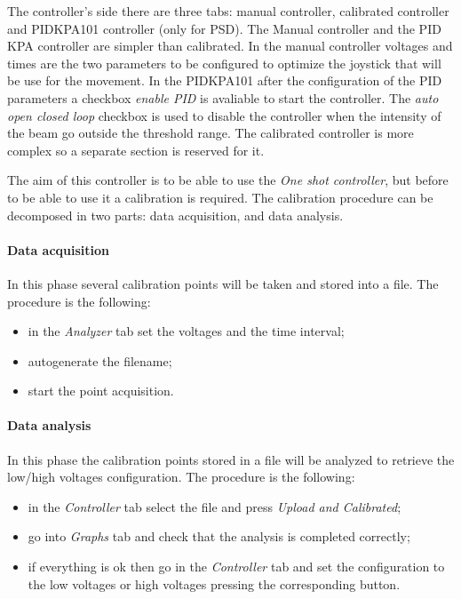 The controller's side there are three tabs: manual controller, calibrated
controller and PIDKPA101 controller (only for PSD).
The Manual controller and the PID KPA controller are simpler than calibrated.
In the manual controller voltages and times are the two parameters to be configured to optimize the joystick that will be use for the movement.
In the PIDKPA101 after the configuration of the PID parameters a checkbox \emph{enable PID}
is avaliable to start the controller. The \emph{auto open closed loop} checkbox is used to
disable the controller when the intensity of the beam go outside the
threshold range.
The calibrated controller is more complex so a separate section is reserved for it.



The aim of this controller is to be able to use the \emph{One shot controller}, but before to be able to use it a calibration is required. The calibration procedure can be decomposed in two parts:
data acquisition, and data analysis.

\paragraph{Data acquisition}

In this phase several calibration points will be taken and stored into a file. The procedure
is the following:

\begin{itemize}
      \itemsep1pt\parskip0pt
      \item
            in the \emph{Analyzer} tab set the voltages and the time interval;
      \item
            autogenerate the filename;
      \item
            start the point acquisition.
\end{itemize}

\paragraph{Data analysis}

In this phase the calibration points stored in a
file will be analyzed to retrieve the low/high voltages configuration. The procedure is the following:

\begin{itemize}
      \itemsep1pt\parskip0pt
      \item
            in the \emph{Controller} tab select the file and press \emph{Upload
                  and Calibrated};
      \item
            go into \emph{Graphs} tab and check that the analysis is completed
            correctly;
      \item
            if everything is ok then go in the \emph{Controller} tab and set the
            configuration to the low voltages or high voltages pressing the
            corresponding button.
\end{itemize}

